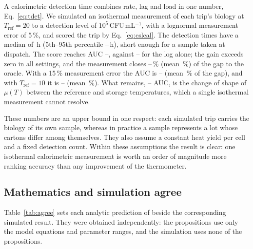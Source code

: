 A calorimetric detection time combines rate, lag and load in one number, Eq.~\eqref{eq:tdet}. We simulated an isothermal measurement of each trip's biology at $T_{\mathrm{ref}}=20$\degC{} to a detection level of $10^5$\,CFU\,mL$^{-1}$, with a lognormal measurement error of 5\,\%, and scored the trip by Eq.~\eqref{eq:cslcal}. The detection times have a median of \CalTdetMed\,h (5th--95th percentile \CalTdetLo--\CalTdetHi\,h), short enough for a sample taken at dispatch. The score reaches AUC \CalCalMin--\CalCalMax, against \CalNomMin--\CalNomMax{} for the log alone; the gain exceeds zero in all \CalGainCalSig{} settings, and the measurement closes \CalFracMin--\CalFracMax\,\% (mean \CalFracMean\,\%) of the gap to the oracle. With a 15\,\% measurement error the AUC is \CalSensBMin--\CalSensBMax{} (mean \CalSensBFrac\,\% of the gap), and with $T_{\mathrm{ref}}=10$\degC{} it is \CalSensCMin--\CalSensCMax{} (mean \CalSensCFrac\,\%). What remains, \CalRestMin--\CalRestMax{} AUC, is the change of shape of $\mu(T)$ between the reference and storage temperatures, which a single isothermal measurement cannot resolve.

These numbers are an upper bound in one respect: each simulated trip carries the biology of its own sample, whereas in practice a sample represents a lot whose cartons differ among themselves. They also assume a constant heat yield per cell and a fixed detection count. Within these assumptions the result is clear: one isothermal calorimetric measurement is worth an order of magnitude more ranking accuracy than any improvement of the thermometer.

\TabCalo

\subsection{Mathematics and simulation agree}
Table~\ref{tab:agree} sets each analytic prediction of  beside the corresponding simulated result. They were obtained independently: the propositions use only the model equations and parameter ranges, and the simulation uses none of the propositions.

